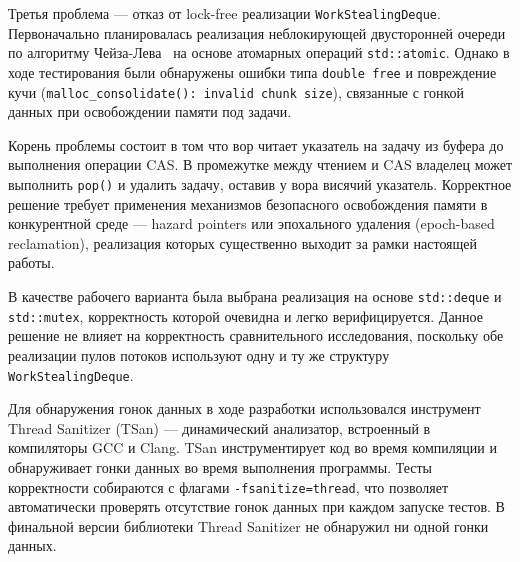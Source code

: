 Третья проблема --- отказ от lock-free реализации
\texttt{WorkStealingDeque}. Первоначально планировалась
реализация неблокирующей двусторонней очереди по алгоритму
Чейза-Лева~\cite{Chase2005} на основе атомарных операций
\texttt{std::atomic}. Однако в ходе тестирования были обнаружены
ошибки типа \texttt{double free} и повреждение кучи
(\texttt{malloc\_consolidate(): invalid chunk size}),
связанные с гонкой данных при освобождении памяти под задачи.

Корень проблемы состоит в том что вор читает указатель на задачу
из буфера до выполнения операции CAS. В промежутке между чтением
и CAS владелец может выполнить \texttt{pop()} и удалить задачу,
оставив у вора висячий указатель. Корректное решение требует
применения механизмов безопасного освобождения памяти в
конкурентной среде --- hazard pointers или эпохального удаления
(epoch-based reclamation), реализация которых существенно
выходит за рамки настоящей работы.

В качестве рабочего варианта была выбрана реализация на основе
\texttt{std::deque} и \texttt{std::mutex}, корректность которой
очевидна и легко верифицируется. Данное решение не влияет
на корректность сравнительного исследования, поскольку обе
реализации пулов потоков используют одну и ту же структуру
\texttt{WorkStealingDeque}.

Для обнаружения гонок данных в ходе разработки использовался
инструмент Thread Sanitizer (TSan) --- динамический анализатор,
встроенный в компиляторы GCC и Clang. TSan инструментирует
код во время компиляции и обнаруживает гонки данных во время
выполнения программы. Тесты корректности собираются с флагами
\texttt{-fsanitize=thread}, что позволяет автоматически
проверять отсутствие гонок данных при каждом запуске тестов.
В финальной версии библиотеки Thread Sanitizer не обнаружил
ни одной гонки данных.
